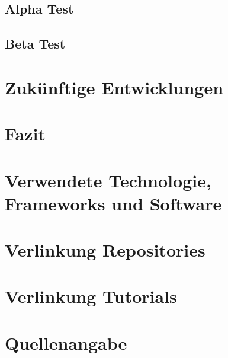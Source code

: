 \documentclass{scrartcl}
\begin{document}
\subsection{Alpha Test}

\subsection{Beta Test}


\newpage

\section{Zukünftige Entwicklungen}


\newpage

\section{Fazit}


\newpage

\section{Verwendete Technologie, Frameworks und Software}


\newpage

\section{Verlinkung Repositories}


\newpage

\section{Verlinkung Tutorials}


\newpage

\section{Quellenangabe}
\end{document}
